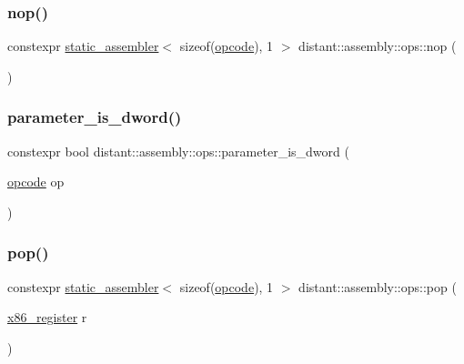 \mbox{\label{namespacedistant_1_1assembly_1_1ops_a85cf8f6f484e34d14f987e14a1d860db}} 
\subsubsection{\texorpdfstring{nop()}{nop()}}
{\footnotesize\ttfamily constexpr \mbox{\hyperlink{classdistant_1_1assembly_1_1static__assembler}{static\+\_\+assembler}}$<$ sizeof(\mbox{\hyperlink{namespacedistant_1_1assembly_a64d7b047d9e3df1ac04919f7c4f8f6fa}{opcode}}), 1 $>$ distant\+::assembly\+::ops\+::nop (\begin{DoxyParamCaption}{ }\end{DoxyParamCaption})\hspace{0.3cm}{\ttfamily [noexcept]}}

\mbox{\label{namespacedistant_1_1assembly_1_1ops_a00ef3c6a8dbb6ecb77c2fe1790ef3ffc}} 
\subsubsection{\texorpdfstring{parameter\+\_\+is\+\_\+dword()}{parameter\_is\_dword()}}
{\footnotesize\ttfamily constexpr bool distant\+::assembly\+::ops\+::parameter\+\_\+is\+\_\+dword (\begin{DoxyParamCaption}\item[{\mbox{\hyperlink{namespacedistant_1_1assembly_a64d7b047d9e3df1ac04919f7c4f8f6fa}{opcode}}}]{op }\end{DoxyParamCaption})\hspace{0.3cm}{\ttfamily [noexcept]}}

\mbox{\label{namespacedistant_1_1assembly_1_1ops_aad1a8063a86e03834e4e4be663c03db5}} 
\subsubsection{\texorpdfstring{pop()}{pop()}}
{\footnotesize\ttfamily constexpr \mbox{\hyperlink{classdistant_1_1assembly_1_1static__assembler}{static\+\_\+assembler}}$<$ sizeof(\mbox{\hyperlink{namespacedistant_1_1assembly_a64d7b047d9e3df1ac04919f7c4f8f6fa}{opcode}}), 1 $>$ distant\+::assembly\+::ops\+::pop (\begin{DoxyParamCaption}\item[{\mbox{\hyperlink{namespacedistant_1_1assembly_a873d3faa0111fc5605de36beaaaafb3e}{x86\+\_\+register}}}]{r }\end{DoxyParamCaption})\hspace{0.3cm}{\ttfamily [noexcept]}}

